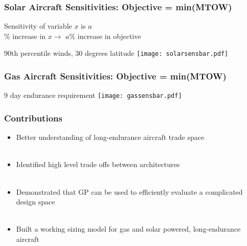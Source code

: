 \documentclass{beamer}
\begin{document}
\begin{frame}
    \frametitle{Solar Aircraft Sensitivities: Objective = min(MTOW)}

    \pause
    Sensitivity of variable $x$ is $a$ \\
    \% increase in $x \rightarrow$ $a\%$ increase in objective 
    \pause
    \begin{center}
        \scriptsize
        90th percentile winds, 30 degrees latitude
    \texttt{[image: solarsensbar.pdf]} 
    \end{center}

\end{frame}

\begin{frame}
    \frametitle{Gas Aircraft Sensitivities: Objective = min(MTOW)}
    
    \pause
    
    \begin{center}
        \scriptsize
        9 day endurance requirement
    \texttt{[image: gassensbar.pdf]} 
    \end{center}

\end{frame}

\begin{frame}
    \frametitle{Contributions}

    \begin{itemize}
        \pause
        \item Better understanding of long-endurance aircraft trade space \\~\\
        \pause
        \item Identified high level trade offs between architectures \\~\\
        \pause
        \item Demonstrated that GP can be used to efficiently evaluate a complicated design space \\~\\
            \pause
        \item Built a working sizing model for gas and solar powered, long-endurance aircraft
        \end{itemize}

\end{frame}
\end{document}
